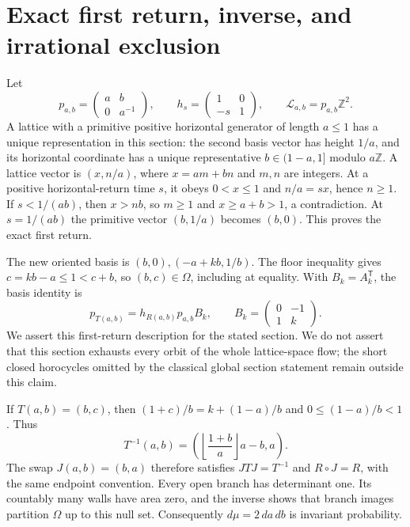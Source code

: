 \documentclass[10pt]{article}
\newcommand{\Z}{\mathbb Z}
\begin{document}
\section{Exact first return, inverse, and irrational exclusion}
Let
\[
p_{a,b}=\begin{pmatrix}a&b\\0&a^{-1}\end{pmatrix},\qquad
h_s=\begin{pmatrix}1&0\\-s&1\end{pmatrix},\qquad
\mathcal L_{a,b}=p_{a,b}\Z^2 .
\]
A lattice with a primitive positive horizontal generator of length $a\leq1$
has a unique representation in this section: the second basis vector has
height $1/a$, and its horizontal coordinate has a unique representative
$b\in(1-a,1]$ modulo $a\Z$.
A lattice vector is $(x,n/a)$, where $x=am+bn$ and $m,n$ are integers.
At a positive horizontal-return time $s$, it obeys
$0<x\leq1$ and $n/a=sx$, hence $n\geq1$.
If $s<1/(ab)$, then $x>nb$, so $m\geq1$ and
$x\geq a+b>1$, a contradiction. At $s=1/(ab)$ the primitive vector
$(b,1/a)$ becomes $(b,0)$. This proves the exact first return.

The new oriented basis is $(b,0),(-a+kb,1/b)$.
The floor inequality gives $c=kb-a\leq1<c+b$, so $(b,c)\in\Omega$,
including at equality. With $B_k=A_k^{\mathsf T}$, the basis identity is
\begin{equation}\label{eq:basis}
p_{T(a,b)}=h_{R(a,b)}p_{a,b}B_k,\qquad
B_k=\begin{pmatrix}0&-1\\1&k\end{pmatrix}.
\end{equation}
We assert this first-return description for the stated section.
We do not assert that this section exhausts every orbit of the whole
lattice-space flow; the short closed horocycles omitted by the classical
global section statement remain outside this claim.

If $T(a,b)=(b,c)$, then
$(1+c)/b=k+(1-a)/b$ and $0\leq(1-a)/b<1$. Thus
\[
T^{-1}(a,b)=\left(\left\lfloor\frac{1+b}{a}\right\rfloor a-b,a\right).
\]
The swap $J(a,b)=(b,a)$ therefore satisfies $JTJ=T^{-1}$ and $R\circ J=R$,
with the same endpoint convention. Every open branch has determinant one.
Its countably many walls have area zero, and the inverse shows that branch
images partition $\Omega$ up to this null set. Consequently
$d\mu=2\,da\,db$ is invariant probability.
\end{document}
